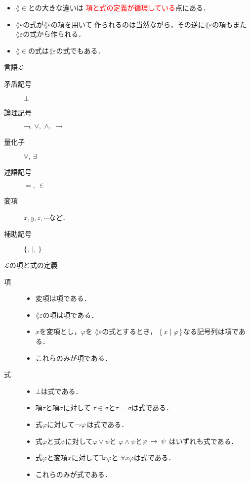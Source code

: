 	\begin{itemize}
	\setlength{\itemsep}{10pt}
		\item $\lang{\in}$との大きな違いは
		 \textcolor{red}{項と式の定義が循環している}点にある．
		
		\item$\lang{\varepsilon}$の式が$\lang{\varepsilon}$の項を用いて
			作られるのは当然ながら，その逆に$\lang{\varepsilon}$の項もまた
			$\lang{\varepsilon}$の式から作られる．
			
		\item $\lang{\in}$の式は$\lang{\varepsilon}$の式でもある．
	\end{itemize}
	
\newpage
	\begin{itembox}[l]{言語$\mathcal{L}$}
		\begin{description}
			\item[矛盾記号] $\bot$
			\item[論理記号] $\negation,\ \vee,\ \wedge,\ \rarrow$
			\item[量化子] $\forall,\ \exists$
			\item[述語記号] $=,\ \in$
			\item[変項] $x,y,z,\cdots$など．
			\item[補助記号] $\{,\ |,\ \}$
		\end{description}
	\end{itembox}
	
	\begin{itembox}[l]{$\mathcal{L}$の項と式の定義}
		\begin{description}
			\item[項] 
				\begin{itemize}
					\item 変項は項である．
					\item $\lang{\varepsilon}$の項は項である．
					\item $x$を変項とし，$\varphi$を
						$\lang{\varepsilon}$の式とするとき，
						$\left\{\, x \mid \varphi\, \right\}$なる記号列は項である．
					\item これらのみが項である．
				\end{itemize}
			
			\item[式] 
				\begin{itemize}
					\item $\bot$は式である．
					\item 項$\tau$と項$\sigma$に対して
						$\tau \in \sigma$と$\tau = \sigma$は式である．
					\item 式$\varphi$に対して$\rightharpoondown\hspace{-0.25em} \varphi$は式である．
					\item 式$\varphi$と式$\psi$に対して$\varphi \vee \psi$と
						$\varphi \wedge \psi$と$\varphi \hspace{0.25em}\rightarrow\hspace{0.25em} \psi$
						はいずれも式である．
					\item 式$\varphi$と変項$x$に対して$\exists x \varphi$と
						$\forall x \varphi$は式である．
					\item これらのみが式である．
				\end{itemize}
		\end{description}
	\end{itembox}